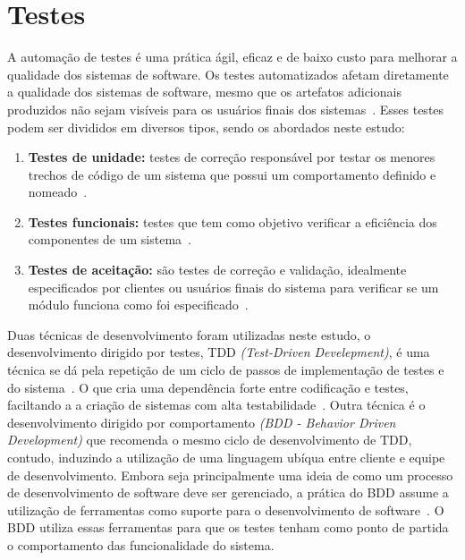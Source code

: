 \section{Testes}
\label{sec:testes}

A automação de testes é uma prática ágil, eficaz e de baixo custo para melhorar
a qualidade dos sistemas de software.
%
Os testes automatizados afetam diretamente a qualidade dos sistemas de software,
 mesmo que os artefatos adicionais produzidos não sejam visíveis para os usuários finais dos sistemas~\cite{bernardo2011}.
Esses testes podem ser divididos em diversos tipos, sendo os abordados neste estudo:

\begin{enumerate}

\item \textbf{Testes de unidade:} testes de correção responsável por testar os 
menores trechos de código de um sistema que possui um comportamento definido e 
nomeado~\cite{bernardo2011}.

\item \textbf{Testes funcionais:} testes que tem como objetivo verificar a eficiência
dos componentes de um sistema~\cite{molinari2003}.

\item \textbf{Testes de aceitação:} são testes de correção e validação, idealmente 
especificados por clientes ou usuários finais do sistema para verificar se um 
módulo funciona como foi especificado~\cite{martin2005}.

\end{enumerate}
Duas técnicas de desenvolvimento foram utilizadas neste estudo, o desenvolvimento dirigido por testes, TDD \textit{(Test-Driven Develepment)}, é uma técnica se dá pela repetição de um ciclo de passos de implementação de testes e do sistema~\cite{koskela2007}.
%
O que cria uma dependência forte entre codificação e testes, faciltando a a criação de sistemas com alta testabilidade~\cite{bernardo2011}. 
%
Outra técnica é o desenvolvimento dirigido por comportamento \textit{(BDD - Behavior Driven Development)} 
 que recomenda o mesmo ciclo de desenvolvimento de TDD, contudo, induzindo 
a utilização de uma linguagem ubíqua entre cliente e equipe de desenvolvimento. 
%
Embora seja principalmente uma ideia de como um processo de desenvolvimento de 
software deve ser gerenciado, a prática do BDD assume a utilização de ferramentas 
como suporte para o desenvolvimento de software~\cite{haring2011}. O BDD utiliza 
essas ferramentas para que os testes tenham como ponto de partida o comportamento 
das funcionalidade do sistema.

